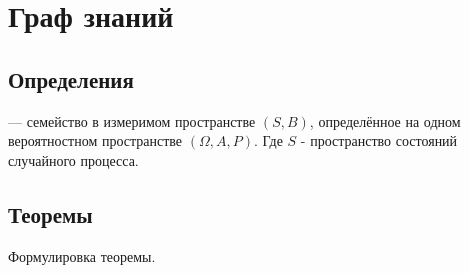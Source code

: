 \section{Граф знаний}

\subsection{Определения}

\begin{definition}
	 — семейство в измеримом пространстве $(S,B)$, определённое на одном вероятностном пространстве $(\Omega, A, P)$.
	Где $S$ - пространство состояний случайного процесса.
\end{definition}



\subsection{Теоремы}
\begin{theorem}
	Формулировка теоремы.
\end{theorem}

